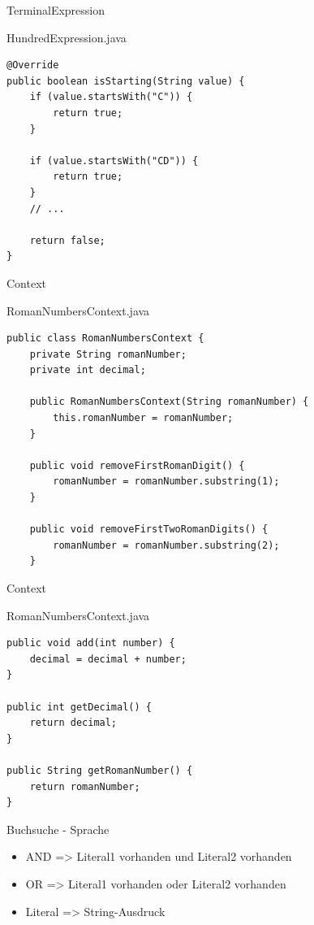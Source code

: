 \begin{frame}[fragile]{TerminalExpression}
	\begin{exampleblock}{HundredExpression.java}
 		\begin{lstlisting}
@Override
public boolean isStarting(String value) {
    if (value.startsWith("C")) {
        return true;
    }
    
    if (value.startsWith("CD")) {
        return true;
    } 
    // ...
    
    return false;
}
 		\end{lstlisting}
 	\end{exampleblock}
\end{frame}

\begin{frame}[fragile]{Context}
	\begin{exampleblock}{RomanNumbersContext.java}
 		\begin{lstlisting}
public class RomanNumbersContext {
	private String romanNumber;
	private int decimal;
	
	public RomanNumbersContext(String romanNumber) {
		this.romanNumber = romanNumber;
	}
	
	public void removeFirstRomanDigit() {
		romanNumber = romanNumber.substring(1);
	}
	
	public void removeFirstTwoRomanDigits() {
		romanNumber = romanNumber.substring(2);
	}
 		\end{lstlisting}
 	\end{exampleblock}
\end{frame}

\begin{frame}[fragile]{Context}
	\begin{exampleblock}{RomanNumbersContext.java}
 		\begin{lstlisting}
public void add(int number) {
    decimal = decimal + number;
}

public int getDecimal() {
    return decimal;
}

public String getRomanNumber() {
    return romanNumber;
}
 		\end{lstlisting}
 	\end{exampleblock}
\end{frame}


\begin{frame}{Buchsuche - Sprache}
	\begin{itemize}
 		\item AND => Literal1 vorhanden und Literal2 vorhanden
 		\item OR => Literal1 vorhanden oder Literal2 vorhanden
 		\item Literal => String-Ausdruck
 	\end{itemize}
\end{frame}

